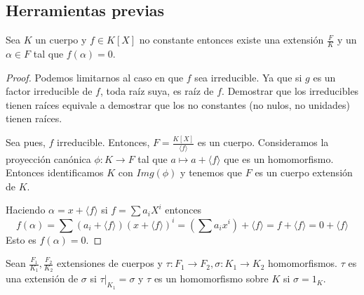 \subsection{Herramientas previas}

\begin{proposition}
	Sea $K$ un cuerpo y $f \in K[X]$ no constante entonces existe una extensión $\frac{F}{K}$ y un $\alpha \in F$ tal que $f(\alpha) = 0$. 
\end{proposition}
\begin{proof}
	Podemos limitarnos al caso en que $f$ sea irreducible. Ya que si $g$ es un factor irreducible de $f$, toda raíz suya, es raíz de $f$. Demostrar que los irreducibles tienen raíces equivale a demostrar que los no constantes (no nulos, no unidades) tienen raíces. 
	
	Sea pues, $f$ irreducible. Entonces, $F = \frac{K[X]}{\langle f \rangle}$ es un cuerpo. Consideramos la proyección canónica $\phi:K \to F$ tal que $a \mapsto a + \langle f \rangle$ que es un homomorfismo. Entonces identificamos $K$ con $Img(\phi)$ y tenemos que $F$ es un cuerpo extensión de $K$. 
	
	Haciendo $\alpha = x + \langle f \rangle$ si $f = \sum a_i X^i$ entonces $$f(\alpha) = \sum (a_i+\langle f \rangle)(x+\langle f \rangle)^i = (\sum a_ix^i) + \langle f \rangle = f+\langle f \rangle = 0 + \langle f \rangle$$ Esto es $f(\alpha) = 0$.  
\end{proof}

\begin{definition}
	Sean $\frac{F_1}{K_1},\frac{F_2}{K_2}$ extensiones de cuerpos y $\tau:F_1 \to F_2,\sigma:K_1 \to K_2$ homomorfismos. $\tau$ es una extensión de $\sigma$ si $\tau|_{K_1} = \sigma$ y $\tau$ es un homomorfismo sobre $K$ si $\sigma = 1_K$.
\end{definition}

